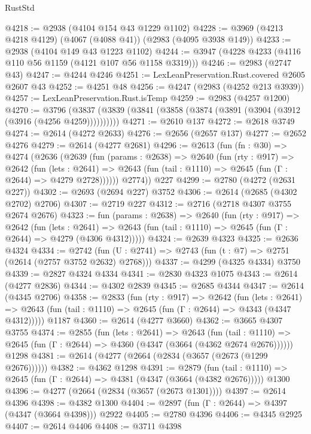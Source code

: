 \begin{lexlean}{RustStd}
\begin{coremodule}
@4218 := @2938 (@4104 @154 @43 @1229 @1102)
@4228 := @3969 (@4213 @4218 @4129) (@4067 (@4088 @41)) (@2983 (@4095 @3938 @149))
@4233 := @2938 (@4104 @149 @43 @1223 @1102)
@4244 := @3947 (@4228 @4233 (@4116 @110 @56 @1159 (@4121 @107 @56 @1158 @3319)))
@4246 := @2983 (@2747 @43)
@4247 := @4244 @4246
@4251 := LexLeanPreservation.Rust.covered @2605 @2607 @43
@4252 := @4251 @48
@4256 := @4247 (@2983 (@4252 @213 @3939))
@4257 := LexLeanPreservation.Rust.isTemp
@4259 := @2983 (@4257 @1200)
@4270 := @3796 (@3837 (@3839 (@3841 (@3858 (@3874 (@3891 (@3904 (@3912 (@3916 (@4256 @4259))))))))))
@4271 := @2610 @137
@4272 := @2618 @3749
@4274 := @2614 (@4272 @2633)
@4276 := @2656 (@2657 @137)
@4277 := @2652 @4276
@4279 := @2614 (@4277 @2681)
@4296 := @2613
    (fun (fn : @30) =>
    @4274
      (@2636
        (@2639
          (fun (params : @2638) =>
          @2640
            (fun (rty : @917) =>
            @2642
              (fun (lets : @2641) =>
              @2643 (fun (tail : @1110) => @2645 (fun (Γ : @2644) => @4279 @2728))))))
        @2774))
    @227
@4299 := @2780 (@4272 (@2631 @227))
@4302 := @2693 (@2694 @227) @3752
@4306 := @2614 (@2685 (@4302 @2702) @2706)
@4307 := @2719 @227
@4312 := @2716 (@2718 @4307 @3755 @2674 @2676)
@4323 := fun (params : @2638) =>
  @2640
    (fun (rty : @917) =>
    @2642
      (fun (lets : @2641) =>
      @2643 (fun (tail : @1110) => @2645 (fun (Γ : @2644) => @4279 (@4306 @4312)))))
@4324 := @2639 @4323
@4325 := @2636 @4324
@4334 := @2742 (fun (U : @2741) => @2743 (fun (t : @7) => @2751 (@2614 (@2757 @3752 @2632) @2768)))
@4337 := @4299 (@4325 @4334) @3750
@4339 := @2827 @4324 @4334
@4341 := @2830 @4323 @1075
@4343 := @2614 (@4277 @2836)
@4344 := @4302 @2839
@4345 := @2685 @4344
@4347 := @2614 (@4345 @2706)
@4358 := @2833
    (fun (rty : @917) =>
    @2642
      (fun (lets : @2641) =>
      @2643 (fun (tail : @1110) => @2645 (fun (Γ : @2644) => @4343 (@4347 @4312)))))
    @1187
@4360 := @2614 (@4277 @3660)
@4362 := @3665 @4307 @3755
@4374 := @2855
    (fun (lets : @2641) =>
    @2643
      (fun (tail : @1110) => @2645 (fun (Γ : @2644) => @4360 (@4347 (@3664 (@4362 @2674 @2676))))))
    @1298
@4381 := @2614 (@4277 (@2664 (@2834 (@3657 (@2673 (@1299 @2676))))))
@4382 := @4362 @1298
@4391 := @2879
    (fun (tail : @1110) => @2645 (fun (Γ : @2644) => @4381 (@4347 (@3664 (@4382 @2676)))))
    @1300
@4396 := @4277 (@2664 (@2834 (@3657 (@2673 @1301))))
@4397 := @2614 @4396
@4398 := @4382 @1300
@4404 := @2897 (fun (Γ : @2644) => @4397 (@4347 (@3664 @4398))) @2922
@4405 := @2780 @4396
@4406 := @4345 @2925
@4407 := @2614 @4406
@4408 := @3711 @4398

\end{coremodule}
\end{lexlean}
